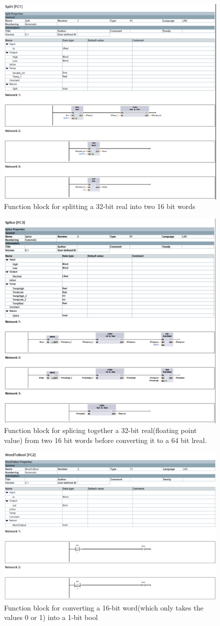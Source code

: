 \begin{figure}[H]
    \centering
    \includegraphics[width=0.5\linewidth]{FBDs/split.PNG}
    \caption{Function block for splitting a 32-bit \Gls{real} into two 16 bit \glspl{word}}
    \label{fig:split}
\end{figure}
\begin{figure}[H]
    \centering
    \includegraphics[width=0.5\linewidth]{FBDs/Splice.PNG}
    \caption{Function block for splicing together a 32-bit \Gls{real}(floating point value) from two 16 bit \glspl{word} before converting it to a 64 bit \Gls{lreal}.}
    \label{fig:Splice}
\end{figure}

\begin{figure}[H]
    \centering
    \includegraphics[width=0.5\linewidth]{FBDs/WordToBool.PNG}
    \caption{Function block for converting a 16-bit \gls{word}(which only takes the values 0 or 1) into a 1-bit \gls{bool}}
    \label{fig:WTB}
\end{figure}